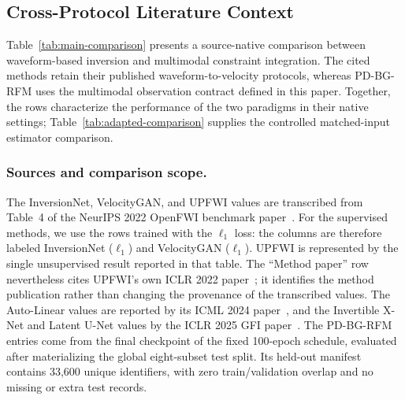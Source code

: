 \documentclass[letterpaper]{article}
\begin{document}
\subsection{Cross-Protocol Literature Context}
\label{app:benchmark-accounting}

Table~\ref{tab:main-comparison} presents a source-native comparison between waveform-based inversion and multimodal constraint integration. The cited methods retain their published waveform-to-velocity protocols, whereas PD-BG-RFM uses the multimodal observation contract defined in this paper. Together, the rows characterize the performance of the two paradigms in their native settings; Table~\ref{tab:adapted-comparison} supplies the controlled matched-input estimator comparison.

\subsubsection{Sources and comparison scope.}
The InversionNet, VelocityGAN, and UPFWI values are transcribed from Table~4 of the NeurIPS 2022 OpenFWI benchmark paper~\cite{deng2022openfwi}. For the supervised methods, we use the rows trained with the $\ell_1$ loss: the columns are therefore labeled InversionNet ($\ell_1$) and VelocityGAN ($\ell_1$). UPFWI is represented by the single unsupervised result reported in that table. The ``Method paper'' row nevertheless cites UPFWI's own ICLR 2022 paper~\cite{jin2022upfwi}; it identifies the method publication rather than changing the provenance of the transcribed values. The Auto-Linear values are reported by its ICML 2024 paper~\cite{feng2024autolinear}, and the Invertible X-Net and Latent U-Net values by the ICLR 2025 GFI paper~\cite{gupta2025gfi}. The PD-BG-RFM entries come from the final checkpoint of the fixed 100-epoch schedule, evaluated after materializing the global eight-subset test split. Its held-out manifest contains 33,600 unique identifiers, with zero train/validation overlap and no missing or extra test records.
\end{document}

